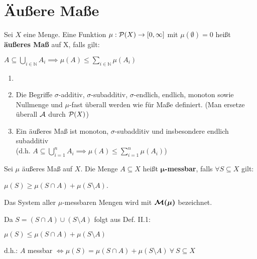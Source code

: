 \chapter{Äußere Maße}
  \begin{definition}
    Sei $X$ eine Menge. Eine Funktion $\mu: \mathcal{P}(X) \to [0,\infty]$ mit $\mu(\emptyset)=0$ heißt \textbf{äußeres Maß} auf X, falls gilt:
    \begin{center}
      $A \subseteq \bigcup\limits_{i \in \mathbb{N}} A_i \implies \mu(A) \leq \sum\limits_{i \in \mathbb{N}} \mu(A_i)$
    \end{center}
  \end{definition}

  \begin{remark}
    \begin{enumerate}
      \item[]
      \item Die Begriffe $\sigma$-additiv, $\sigma$-subadditiv, $\sigma$-endlich, endlich, monoton sowie Nullmenge und $\mu$-fast überall werden wie für Maße definiert. (Man ersetze überall $\mathcal{A}$ durch $\mathcal{P}(X)$)
      \item Ein äußeres Maß ist monoton, $\sigma$-subadditiv und insbesondere endlich subadditiv\\
        (d.h. $A \subseteq \bigcup\limits_{i=1}^n A_i \implies \mu(A) \leq \sum\limits_{i = 1}^n \mu(A_i)$)
    \end{enumerate}
  \end{remark}

  \begin{definition}
    Sei $\mu$ äußeres Maß auf $X$. Die Menge $A \subseteq X$ heißt \textbf{$\bm{\mu}$-messbar}, falls $\forall S \subseteq X$ gilt:
    \begin{center}
      $\mu(S) \geq \mu(S \cap A) + \mu(S \setminus A)$.
    \end{center}
    Das System aller $\mu$-messbaren Mengen wird mit $\bm{\mathcal{M}(\mu)}$ bezeichnet.
  \end{definition}

  \begin{remark}
    Da $S = (S \cap A) \cup (S \setminus A)$ folgt aus Def. II.1:
    \begin{center}
      $\mu(S) \leq \mu(S \cap A) + \mu(S \setminus A)$
    \end{center}
    d.h.: $A$ messbar $\Leftrightarrow \mu(S) = \mu(S \cap A) + \mu(S \setminus A) \ \forall \ S \subseteq X$ 
  \end{remark}

